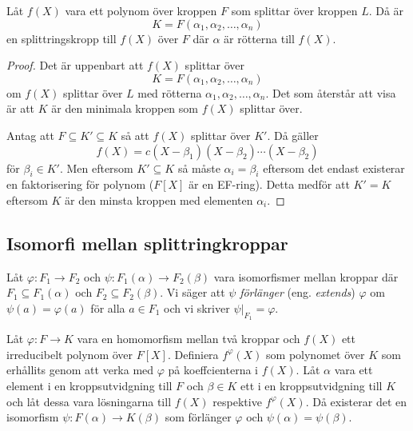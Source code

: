 \documentclass{article}
\theoremstyle{definition}
\begin{document}
\hypertarget{lemma6.0.1}{}
\begin{mylemma}{}{}
  Låt $f(X)$ vara ett polynom över kroppen $F$ som splittar över kroppen $L$. Då är 
  \[K = F(\alpha_1, \alpha_2, \ldots, \alpha_n)\]
  en splittringskropp till $f(X)$ över $F$ där $\alpha$ är rötterna till $f(X)$.
\end{mylemma}

\begin{proof}
  Det är uppenbart att $f(X)$ splittar över 
  \[K = F(\alpha_1, \alpha_2, \ldots, \alpha_n)\]
  om $f(X)$ splittar över $L$ med rötterna $\alpha_1, \alpha_2, \ldots, \alpha_n$. Det som återstår att visa är att 
  $K$ är den minimala kroppen som $f(X)$ splittar över. 

  Antag att $F \subseteq K' \subseteq K$ så att $f(X)$ splittar över $K'$. Då gäller 
  \[f(X) = c(X- \beta_1)(X - \beta_2)\cdots (X - \beta_2)\]
  för $\beta_i \in K'.$ 
  Men eftersom $K' \subseteq K$ så måste $\alpha_i = \beta_i$ eftersom det endast existerar en faktorisering för polynom ($F[X]$ är en EF-ring). 
  Detta medför att $K' = K$ eftersom $K$ är den minsta kroppen med elementen $\alpha_i$.
\end{proof}

\subsection{Isomorfi mellan splittringkroppar}
\begin{mydef}{}{}
  Låt $\varphi: F_1 \rightarrow F_2$ och $\psi: F_1(\alpha) \rightarrow F_2(\beta)$ vara isomorfismer mellan kroppar där $F_1 \subseteq F_1(\alpha)$
  och $F_2 \subseteq F_2(\beta)$. 
  Vi säger att $\psi$ \textit{förlänger} (eng. \textit{extends})
  $\varphi$ om $\psi(a) = \varphi(a)$ för alla $a \in F_1$ och vi skriver $\psi |_{F_1} = \varphi.$
\end{mydef}

\hypertarget{6.0.2}{}
\begin{mylemma}{}{}
  Låt $\varphi: F \rightarrow K$ vara en homomorfism mellan två kroppar och $f(X)$ ett irreducibelt polynom över $F[X]$. Definiera $f^{\varphi}(X)$
  som polynomet över $K$ som erhållits genom att verka med $\varphi$ på koeffcienterna i $f(X)$. Låt $\alpha$ vara ett element i en kroppsutvidgning till $F$
  och $\beta \in K$ ett i en kroppsutvidgning till $K$ och låt dessa vara lösningarna till
  $f(X)$ respektive $f^{\varphi}(X)$. Då existerar det en isomorfism $\psi:F(\alpha) \rightarrow K(\beta)$ 
  som förlänger $\varphi$ och $\psi(\alpha) = \psi(\beta).$
\end{mylemma}
\end{document}
